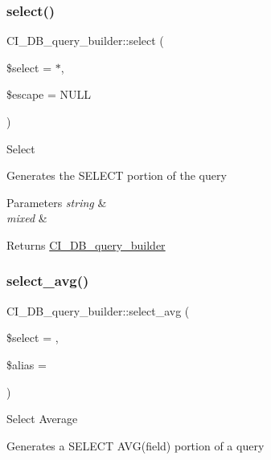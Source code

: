 \subsubsection{\texorpdfstring{select()}{select()}}
{\footnotesize\ttfamily C\+I\+\_\+\+D\+B\+\_\+query\+\_\+builder\+::select (\begin{DoxyParamCaption}\item[{}]{\$select = {\ttfamily \textquotesingle{}$\ast$\textquotesingle{}},  }\item[{}]{\$escape = {\ttfamily NULL} }\end{DoxyParamCaption})}

Select

Generates the S\+E\+L\+E\+CT portion of the query


\begin{DoxyParams}{Parameters}
{\em string} & \\
\hline
{\em mixed} & \\
\hline
\end{DoxyParams}
\begin{DoxyReturn}{Returns}
\mbox{\hyperlink{class_c_i___d_b__query__builder}{C\+I\+\_\+\+D\+B\+\_\+query\+\_\+builder}} 
\end{DoxyReturn}
\mbox{\label{class_c_i___d_b__query__builder_aef7b0cb3f2b2a8daa251cff5b28784d6}} 
\subsubsection{\texorpdfstring{select\+\_\+avg()}{select\_avg()}}
{\footnotesize\ttfamily C\+I\+\_\+\+D\+B\+\_\+query\+\_\+builder\+::select\+\_\+avg (\begin{DoxyParamCaption}\item[{}]{\$select = {\ttfamily \textquotesingle{}\textquotesingle{}},  }\item[{}]{\$alias = {\ttfamily \textquotesingle{}\textquotesingle{}} }\end{DoxyParamCaption})}

Select Average

Generates a S\+E\+L\+E\+CT A\+V\+G(field) portion of a query


